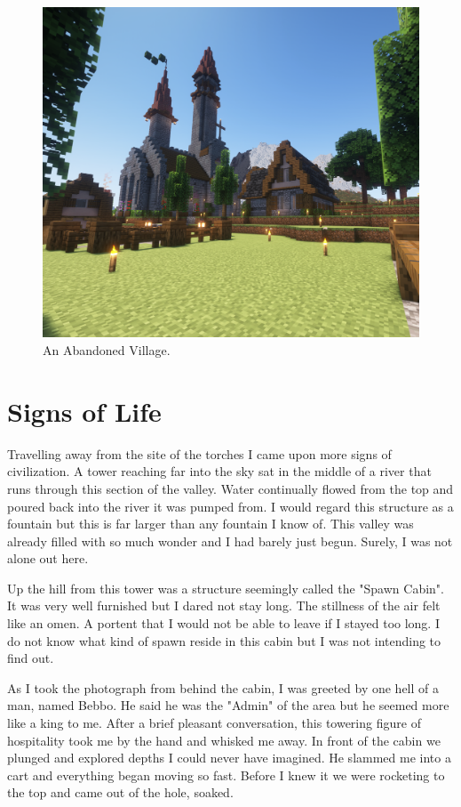 \begin{figure}[H]
	\centering
	\includegraphics[width=1\linewidth]{Ghost Town.png}
	\caption{An Abandoned Village.}
\end{figure}

\section{Signs of Life}

\large
Travelling away from the site of the torches I came upon more signs of civilization. A tower reaching far into the sky sat in the middle of a river that runs through this section of the valley. Water continually flowed from the top and poured back into the river it was pumped from. I would regard this structure as a fountain but this is far larger than any fountain I know of. This valley was already filled with so much wonder and I had barely just begun. Surely, I was not alone out here.

Up the hill from this tower was a structure seemingly called the "Spawn Cabin". It was very well furnished but I dared not stay long. The stillness of the air felt like an omen. A portent that I would not be able to leave if I stayed too long. I do not know what kind of spawn reside in this cabin but I was not intending to find out. 

As I took the photograph from behind the cabin, I was greeted by one hell of a man, named Bebbo. He said he was the "Admin" of the area but he seemed more like a king to me. After a brief pleasant conversation, this towering figure of hospitality took me by the hand and whisked me away. In front of the cabin we plunged and explored depths I could never have imagined. He slammed me into a cart and everything began moving so fast. Before I knew it we were rocketing to the top and came out of the hole, soaked.

